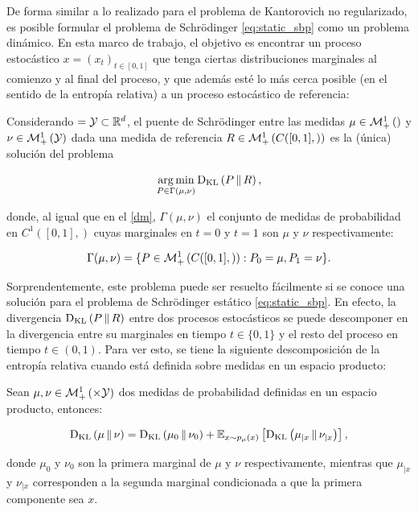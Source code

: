 De forma similar a lo realizado para el problema de Kantorovich no regularizado, es posible formular el problema de Schrödinger \eqref{eq:static_sbp} como un problema dinámico. En esta marco de trabajo, el objetivo es encontrar un proceso estocástico $x=(x_t)_{t\in[0,1]}$ que tenga ciertas distribuciones marginales al comienzo y al final del proceso, y que además esté lo más cerca posible (en el sentido de la entropía relativa) a un proceso estocástico de referencia:

\begin{defn}
	Considerando $=\mathcal{Y}\subset\mathbb{R}^d$, el puente de Schrödinger entre las medidas $\mu\in\mathcal{M}_+^1\left(\right)$ y $\nu\in\mathcal{M}_+^1\left(\mathcal{Y}\right)$ dada una medida de referencia $R\in\mathcal{M}_+^1\left(C([0,1],)\right)$ es la (única) solución del problema

	\begin{equation}
		\label{eq:dynamic_sbp}
		\operatorname*{arg\,min}_{P\in\Gamma(\mu,\nu)} \operatorname{D_{KL}}\left(P\,\|\,R\right),
	\end{equation}
\end{defn}

donde, al igual que en el \autoref{dm}, $\Gamma(\mu,\nu)$ el conjunto de medidas de probabilidad en $C^1([0,1],\xspace)$ cuyas marginales en $t=0$ y $t=1$ son $\mu$ y $\nu$ respectivamente:

\begin{equation*}
	\Gamma(\mu,\nu) = \{P\in \mathcal{M}_+^1\left(C([0,1],)\right): P_0=\mu, P_1 = \nu\}.
\end{equation*}

Sorprendentemente, este problema puede ser resuelto fácilmente si se conoce una solución para el problema de Schrödinger estático \eqref{eq:static_sbp}. En efecto, la divergencia $\operatorname{D_{KL}}\left(P\,\|\,R\right)$ entre dos procesos estocásticos se puede descomponer en la divergencia entre su marginales en tiempo $t\in\{0,1\}$ y el resto del proceso en tiempo $t\in(0,1)$. Para ver esto, se tiene la siguiente descomposición de la entropía relativa cuando está definida sobre medidas en un espacio producto:

\begin{prop}
	Sean $\mu,\nu\in\probmeasure{\xspace\times\yspace}$ dos medidas de probabilidad definidas en un espacio producto, entonces:

	\begin{equation*}
		\operatorname{D_{KL}}\left(\mu\,\|\,\nu\right) = \operatorname{D_{KL}}\left(\mu_0\,\|\,\nu_0\right) + \mathbb{E}_{x\sim p_\mu(x)}\left[\operatorname{D_{KL}}\left(\mu_{|x}\,\|\,\nu_{|x}\right)\right],
	\end{equation*}

	donde $\mu_0$ y $\nu_0$ son la primera marginal de $\mu$ y $\nu$ respectivamente, mientras que $\mu_{|x}$ y $\nu_{|x}$ corresponden a la segunda marginal condicionada a que la primera componente sea $x$.
\end{prop}

